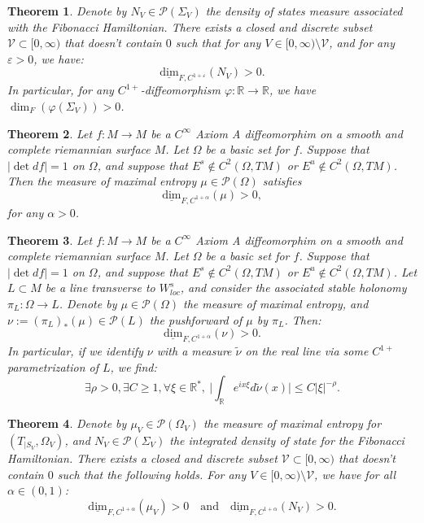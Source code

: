 \documentclass[10pt,a4paper]{amsart}
\newtheorem{theorem}{Theorem}
\begin{document}
\begin{theorem}\label{th:IDS2}
Denote by $N_V \in \mathcal{P}(\Sigma_V)$ the density of states measure associated with the Fibonacci Hamiltonian. There exists a closed and discrete subset $\mathcal{V}\subset [0,\infty)$ that doesn't contain $0$ such that for any $V \in [0,\infty) \setminus \mathcal{V}$, and for any $\varepsilon>0$, we have:
$$ \underline{\text{dim}}_{F,C^{1+\varepsilon}}(N_V)>0 .$$
In particular, for any $C^{1+}$-diffeomorphism $\varphi:\mathbb{R} \rightarrow \mathbb{R}$, we have $\dim_F(\varphi(\Sigma_V)) > 0$.
\end{theorem}

\begin{theorem}\label{th:main1}
Let $f:M \rightarrow M$ be a $C^\infty$ Axiom A diffeomorphim on a smooth and complete riemannian surface $M$. Let $\Omega$ be a basic set for $f$. Suppose that $|\det df| = 1$ on $\Omega$, and suppose that $E^s \notin C^2(\Omega,TM)$ or $E^u \notin C^2(\Omega,TM)$. Then the measure of maximal entropy $\mu \in \mathcal{P}(\Omega)$ satisfies
$$ \underline{\text{dim}}_{F,C^{1+\alpha}}(\mu) > 0,$$
for any $\alpha>0$.
\end{theorem}

\begin{theorem}\label{th:main2}
Let $f:M \rightarrow M$ be a $C^\infty$ Axiom A diffeomorphim on a smooth and complete riemannian surface $M$. Let $\Omega$ be a basic set for $f$. Suppose that $|\det df| = 1$ on $\Omega$, and suppose that $E^s \notin C^2(\Omega,TM)$ or $E^u \notin C^2(\Omega,TM)$. Let $L \subset M$ be a line transverse to $W^s_{loc}$, and consider the associated stable holonomy $\pi_L : \Omega \rightarrow L$. Denote by $\mu \in \mathcal{P}(\Omega)$ the measure of maximal entropy, and $\nu := (\pi_L)_*(\mu) \in \mathcal{P}(L)$ the pushforward of $\mu$ by $\pi_L$. Then:
$$ \underline{\text{dim}}_{F,C^{1+\alpha}}( \nu ) > 0.$$
In particular, if we identify $\nu$ with a measure $\tilde{\nu}$ on the real line via some $C^{1+}$ parametrization of $L$, we find:
$$ \exists \rho >0, \exists C \geq 1, \forall \xi \in \mathbb{R}^*, \ \Big| \int_\mathbb{R} e^{i x \xi} d\tilde{\nu}(x) \Big| \leq C |\xi|^{-\rho}. $$
\end{theorem}

\begin{theorem}\label{th:IDS3}
Denote by $\mu_V \in \mathcal{P}(\Omega_V)$ the measure of maximal entropy for $(T_{|S_V},\Omega_V)$, and $N_V \in \mathcal{P}(\Sigma_V)$ the integrated density of state for the Fibonacci Hamiltonian. There exists a closed and discrete subset $\mathcal{V}\subset [0,\infty)$ that doesn't contain $0$ such that the following holds. For any $V \in [0,\infty) \setminus \mathcal{V}$, we have for all $\alpha \in (0,1)$:
$$   \underline{\text{dim}}_{F,C^{1+\alpha}}(\mu_V) > 0 \quad \text{and} \quad \underline{\text{dim}}_{F,C^{1+\alpha}}(N_V) > 0 . $$
\end{theorem}
\end{document}
